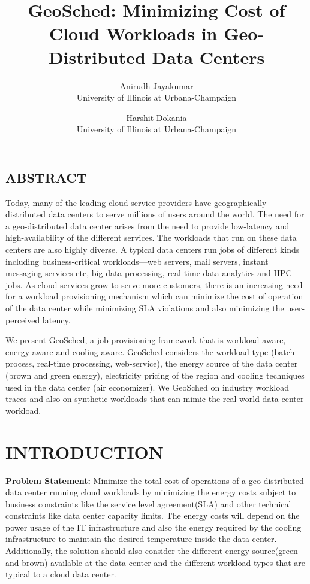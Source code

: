 \documentclass[letterpaper,twocolumn,12pt]{article}
\title{\Large \bf GeoSched: Minimizing Cost of Cloud Workloads in Geo-Distributed Data Centers}
\author{
{\rm Anirudh Jayakumar}\\
University of Illinois at Urbana-Champaign
\and
{\rm Harshit Dokania}\\
University of Illinois at Urbana-Champaign
} %
\begin{document}
 
  \maketitle 


\subsection*{ABSTRACT}
Today, many of the leading cloud service providers have geographically distributed data centers to serve millions of users around the world. The need for a geo-distributed data center arises from the need to provide low-latency and  high-availability of the different services. The workloads that run on these data centers are also highly diverse. A typical data centers run jobs of different kinds including business-critical workloads---web servers, mail servers, instant messaging services etc, big-data processing, real-time data analytics and HPC jobs. As cloud services grow to serve more customers, there is an increasing need for a workload provisioning mechanism which can minimize the cost of operation of the data center while minimizing SLA violations and also minimizing the user-perceived latency. 

We present GeoSched, a job provisioning framework that is workload aware, energy-aware and cooling-aware. GeoSched considers the workload type (batch process, real-time processing, web-service), the energy source of the data center (brown and green energy), electricity pricing of the region and cooling techniques used in the data center (air economizer). We GeoSched on industry workload traces and also on synthetic workloads that can mimic the real-world data center workload. 

\section{INTRODUCTION}
\label{sec:intro}

\textbf{Problem Statement:} Minimize the total cost of operations of a geo-distributed data center running cloud workloads by minimizing the energy costs subject to business constraints like the service level agreement(SLA) and other technical constraints like data center capacity limits. The energy costs will depend on the power usage of the IT infrastructure and also the energy required by the cooling infrastructure to maintain the desired temperature inside the data center. Additionally, the solution should also consider the different energy source(green and brown) available at the data center and the different workload types that are typical to a cloud data center.
\end{document}
